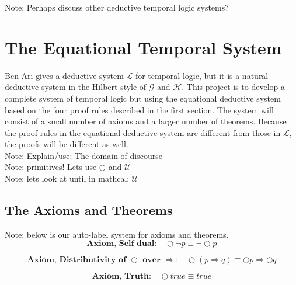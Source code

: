 \documentclass[fleqn, leqno]{article}
\newcommand{\next}{\bigcirc}
\begin{document}
Note: Perhaps discuss other deductive temporal logic systems?\\

\section{The Equational Temporal System}

Ben-Ari \cite{Ben} gives a deductive system $\mathcal{L}$ for temporal logic, but it is a
natural deductive system in the Hilbert style of $\mathcal{G}$ and $\mathcal{H}$. This project is to develop a complete system of
temporal logic but using the equational deductive system based on the four proof rules described
in the first section. The system will consist of a small number of axioms and a larger number of
theorems. Because the proof rules in the equational deductive system are different from those
in $\mathcal{L}$, the proofs will be different as well.\\

Note: Explain/use: The domain of discourse\\

Note: primitives!  Lets use $\next$ and $\mathcal{U}$\\

Note: lets look at until in mathcal: $\mathcal{U}$\\



\subsection{The Axioms and Theorems}

Note: below is our auto-label system for axioms and theorems.\\

\begin{equation}\label{E:selfDual}
\textbf{Axiom, Self-dual:}\quad \next\lnot p \equiv \lnot\next p
\end{equation}

\begin{equation}\label{E:distNextImp}
\textbf{Axiom, Distributivity of $\next$ over $\Rightarrow$:}\quad \next (p \Rightarrow q) \equiv \next p \Rightarrow \next q
\end{equation}

\begin{equation}\label{E:nextTruth}
\textbf{Axiom, Truth:}\quad \next true \equiv true
\end{equation}
\end{document}
